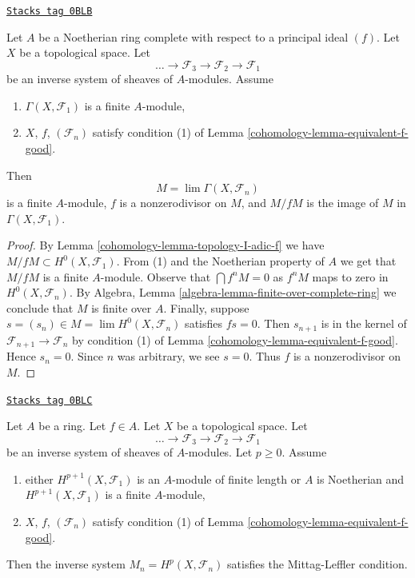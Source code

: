 \begin{lemma}
\label{cohomology-lemma-limit-finite}
\href{https://stacks.math.columbia.edu/tag/0BLB}{\texttt{Stacks tag 0BLB}}

Let $A$ be a Noetherian ring complete with respect to a principal ideal $(f)$.
Let $X$ be a topological space. Let
$$
\ldots \to \mathcal{F}_3 \to \mathcal{F}_2 \to \mathcal{F}_1
$$
be an inverse system of sheaves of $A$-modules. Assume
\begin{enumerate}
\item $\Gamma(X, \mathcal{F}_1)$ is a finite $A$-module,
\item $X$, $f$, $(\mathcal{F}_n)$ satisfy condition (1) of
Lemma \ref{cohomology-lemma-equivalent-f-good}.
\end{enumerate}
Then
$$
M = \lim \Gamma(X, \mathcal{F}_n)
$$
is a finite $A$-module, $f$ is a nonzerodivisor on $M$, and
$M/fM$ is the image of $M$ in $\Gamma(X, \mathcal{F}_1)$.
\end{lemma}

\begin{proof}

By Lemma \ref{cohomology-lemma-topology-I-adic-f} we have
$M/fM \subset H^0(X, \mathcal{F}_1)$. From (1) and the Noetherian
property of $A$ we get that $M/fM$ is a finite $A$-module.
Observe that $\bigcap f^nM = 0$ as $f^nM$ maps to zero in
$H^0(X, \mathcal{F}_n)$. By
Algebra, Lemma \ref{algebra-lemma-finite-over-complete-ring}
we conclude that $M$ is finite over $A$.
Finally, suppose $s = (s_n) \in M = \lim H^0(X, \mathcal{F}_n)$
satisfies $fs = 0$. Then $s_{n + 1}$ is in the kernel of
$\mathcal{F}_{n + 1} \to \mathcal{F}_n$ by condition (1) of
Lemma \ref{cohomology-lemma-equivalent-f-good}.
Hence $s_n = 0$. Since $n$ was arbitrary, we see $s = 0$.
Thus $f$ is a nonzerodivisor on $M$.
\end{proof}

\begin{lemma}[ML]
\label{cohomology-lemma-ML}
\href{https://stacks.math.columbia.edu/tag/0BLC}{\texttt{Stacks tag 0BLC}}

Let $A$ be a ring. Let $f \in A$. Let $X$ be a topological space. Let
$$
\ldots \to \mathcal{F}_3 \to \mathcal{F}_2 \to \mathcal{F}_1
$$
be an inverse system of sheaves of $A$-modules. Let $p \geq 0$. Assume
\begin{enumerate}
\item either $H^{p + 1}(X, \mathcal{F}_1)$ is an $A$-module of finite length
or $A$ is Noetherian and $H^{p + 1}(X, \mathcal{F}_1)$ is a finite $A$-module,
\item $X$, $f$, $(\mathcal{F}_n)$ satisfy condition (1) of
Lemma \ref{cohomology-lemma-equivalent-f-good}.
\end{enumerate}
Then the inverse system $M_n = H^p(X, \mathcal{F}_n)$ satisfies the
Mittag-Leffler condition.
\end{lemma}

